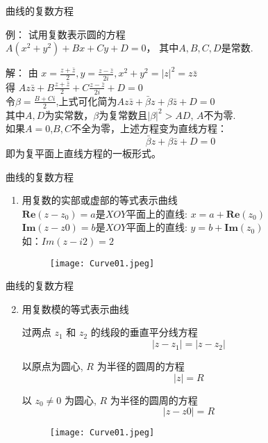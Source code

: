 \documentclass{beamer}
\begin{document}
\begin{frame}{曲线的复数方程}

\begin{exampleblock}{例： 试用复数表示圆的方程 \\$A(x^2+y^2) +Bx + Cy +D = 0$， 其中$A, B, C, D$是常数.}

解： 由 $x = \frac{z+\bar{z}}{2}, y = \frac{z-\bar{z}}{2i}, x^2+y^2 = |z|^2=z\bar{z}$\\
得 $Az\bar{z}+B\frac{z+\bar{z}}{2}+C\frac{z-\bar{z}}{2i}+D = 0 $\\
令$\beta = \frac{B+Ci}{2}$,上式可化简为$Az\bar{z}+\bar{\beta} z + \beta \bar{z} +D =0$\\
其中$A,D$为实常数，$\beta$为复常数且$|\beta|^2>AD$, $A$不为零.\\
如果$A=0$,$B,C$不全为零，上述方程变为直线方程：
$$\bar{\beta} z + \beta \bar{z} +D =0$$
即为复平面上直线方程的一板形式。
\end{exampleblock}
 
\end{frame}

\begin{frame}{曲线的复数方程}

\begin{enumerate}
	\item 用复数的实部或虚部的等式表示曲线\\
	$\mathbf{Re}(z-z_0)=a $是$XOY$平面上的直线: $x=a+\mathbf{Re}(z_0)$\\
	$\mathbf{Im}(z-z0)=b$是$XOY$平面上的直线: $y=b+\mathbf{Im}(z_0)$\\
	如：$Im(z-i2)=2$
\begin{figure}
\texttt{[image: Curve01.jpeg]}
\end{figure}
\end{enumerate}
\end{frame}

\begin{frame}{曲线的复数方程}

\begin{enumerate}
	\setcounter{enumi}{1}
	\item 用复数模的等式表示曲线\\


\begin{example}
过两点 $ z_1 $ 和 $ z_2 $ 的线段的垂直平分线方程
\[ |z - z_1 | = | z - z_2| \]	
\end{example}
 
\begin{example}
以原点为圆心, $ R $ 为半径的圆周的方程
\[ |z| = R \]
\end{example}

\begin{example}
以 $  z_0 \neq 0 $ 为圆心, $ R $ 为半径的圆周的方程
\[ |z - z0| = R \]	
\end{example}
\begin{figure}
\texttt{[image: Curve01.jpeg]}
\end{figure}
\end{enumerate}
\end{frame}
\end{document}
